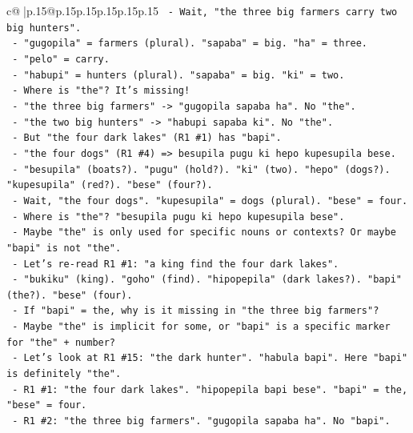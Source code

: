 \documentclass{article}
\begin{document}
{\begin{supertabular}{c@{$\;$}|p{.15\linewidth}@{}p{.15\linewidth}p{.15\linewidth}p{.15\linewidth}p{.15\linewidth}p{.15\linewidth}}
{{{\texttt{            {-} Wait, "the three big farmers carry two big hunters".} \\
\texttt{            {-} "gugopila" = farmers (plural). "sapaba" = big. "ha" = three.} \\
\texttt{            {-} "pelo" = carry.} \\
\texttt{            {-} "habupi" = hunters (plural). "sapaba" = big. "ki" = two.} \\
\texttt{            {-} Where is "the"? It's missing!} \\
\texttt{            {-} "the three big farmers" {-}> "gugopila sapaba ha". No "the".} \\
\texttt{            {-} "the two big hunters" {-}> "habupi sapaba ki". No "the".} \\
\texttt{            {-} But "the four dark lakes" (R1 \#1) has "bapi".} \\
\texttt{            {-} "the four dogs" (R1 \#4) => besupila pugu ki hepo kupesupila bese.} \\
\texttt{              {-} "besupila" (boats?). "pugu" (hold?). "ki" (two). "hepo" (dogs?). "kupesupila" (red?). "bese" (four?).} \\
\texttt{              {-} Wait, "the four dogs". "kupesupila" = dogs (plural). "bese" = four.} \\
\texttt{              {-} Where is "the"? "besupila pugu ki hepo kupesupila bese".} \\
\texttt{              {-} Maybe "the" is only used for specific nouns or contexts? Or maybe "bapi" is not "the".} \\
\texttt{              {-} Let's re{-}read R1 \#1: "a king find the four dark lakes".} \\
\texttt{              {-} "bukiku" (king). "goho" (find). "hipopepila" (dark lakes?). "bapi" (the?). "bese" (four).} \\
\texttt{              {-} If "bapi" = the, why is it missing in "the three big farmers"?} \\
\texttt{              {-} Maybe "the" is implicit for some, or "bapi" is a specific marker for "the" + number?} \\
\texttt{              {-} Let's look at R1 \#15: "the dark hunter". "habula bapi". Here "bapi" is definitely "the".} \\
\texttt{              {-} R1 \#1: "the four dark lakes". "hipopepila bapi bese". "bapi" = the, "bese" = four.} \\
\texttt{              {-} R1 \#2: "the three big farmers". "gugopila sapaba ha". No "bapi".} \\
}}}
\end{supertabular}}
\end{document}
